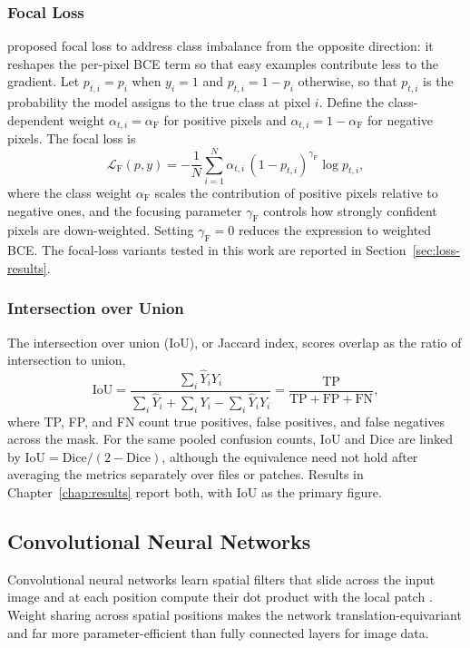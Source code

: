 \subsubsection{Focal Loss}

\textcite{lin_focal_2017} proposed focal loss to address class imbalance from the opposite direction: it reshapes the per-pixel BCE term so that easy examples contribute less to the gradient. Let $p_{t,i} = p_i$ when $y_i = 1$ and $p_{t,i} = 1 - p_i$ otherwise, so that $p_{t,i}$ is the probability the model assigns to the true class at pixel $i$. Define the class-dependent weight $\alpha_{t,i} = \alpha_\text{F}$ for positive pixels and $\alpha_{t,i} = 1-\alpha_\text{F}$ for negative pixels. The focal loss is
\begin{equation}
    \mathcal{L}_\text{F}(p, y) = -\frac{1}{N}\sum_{i=1}^{N}\alpha_{t,i} \, (1 - p_{t,i})^{\gamma_\text{F}} \log p_{t,i},
\end{equation}
where the class weight $\alpha_\text{F}$ scales the contribution of positive pixels relative to negative ones, and the focusing parameter $\gamma_\text{F}$ controls how strongly confident pixels are down-weighted. Setting $\gamma_\text{F}=0$ reduces the expression to weighted BCE\@. The focal-loss variants tested in this work are reported in Section~\ref{sec:loss-results}.

\subsubsection{Intersection over Union}

The intersection over union (IoU), or Jaccard index, scores overlap as the ratio of intersection to union,
\begin{equation}
    \text{IoU} = \frac{\sum_i \hat{Y}_i Y_i}{\sum_i \hat{Y}_i + \sum_i Y_i - \sum_i \hat{Y}_i Y_i} = \frac{\text{TP}}{\text{TP} + \text{FP} + \text{FN}},
\end{equation}
where TP, FP, and FN count true positives, false positives, and false negatives across the mask. For the same pooled confusion counts, IoU and Dice are linked by $\text{IoU} = \text{Dice}/(2 - \text{Dice})$, although the equivalence need not hold after averaging the metrics separately over files or patches. Results in Chapter~\ref{chap:results} report both, with IoU as the primary figure.

\subsection{Convolutional Neural Networks}
Convolutional neural networks learn spatial filters that slide across the input image and at each position compute their dot product with the local patch \cite{lecun_deep_2015}. Weight sharing across spatial positions makes the network translation-equivariant and far more parameter-efficient than fully connected layers for image data.

